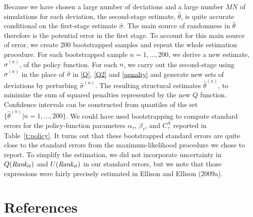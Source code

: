 \documentclass[11pt]{article}
\newcommand{\Rank}{\mbox{\it Rank}}
\newcommand{\cut}[1]{C_{\tau}^{\,#1}}
\begin{document}
Because we have chosen a large number of deviations and a large number
$MN$ of simulations for each deviation, the second-stage estimate,
$\hat{\theta}$, is quite accurate conditional on the first-stage
estimate $\hat{\sigma}$. The main source of randomness in
$\hat{\theta}$ therefore is the potential error in the first stage. To
account for this main source of error, we create 200 bootstrapped
samples and repeat the whole estimation procedure.
For each
  bootstrapped sample $n = 1, \ldots, 200$, we derive a new estimate,
  $\hat{\sigma}^{(n)}$, of the policy function. For each $n$, we carry
  out the second-stage using $\hat{\sigma}^{(n)}$ in the place of
  $\hat{\sigma}$ in \eqref{Q}, \eqref{Q2} and \eqref{penalty} and
  generate new sets of deviations by perturbing $\hat{\sigma}^{(n)}$.
  The resulting structural estimates $\hat{\theta}^{(n)}$, to minimize
  the sum of squared penalties represented by the new $Q$
  function. Confidence intervals can be constructed from quantiles of
  the set $\{\hat{\theta}^{(n)} | n = 1,\dots, 200 \}$. We could have
  used bootstrapping to compute standard errors for the
  policy-function parameters $\alpha_\tau$, $\beta_\tau$, and
  $\cut{k}$ reported in Table~\ref{t:policy}. It turns out that these
  bootstrapped standard errors are quite close to the standard errors
  from the maximum-likelihood procedure we chose to report. To
simplify the estimation, we did not incorporate uncertainty in
$Q(\Rank_{it})$ and $U(\Rank_{it})$ in our standard errors, but we
note that those expressions were fairly precisely estimated in Ellison
and Ellison (2009a).


\newpage

\section*{References}
\end{document}
